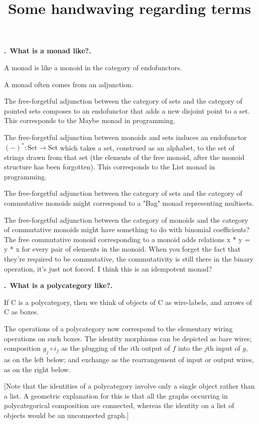 \documentclass[11pt,noamsfonts]{amsart}
\title{Some handwaving regarding terms}
\newcommand{\pointheader}{\vspace{2mm}\noindent\refstepcounter{section}\textbf{\thesection.}}
\newcommand{\bpoint}[1]{\pointheader~{\bf #1.}}
\begin{document}
\maketitle

\bpoint{What is a monad like?}

A monad is like a monoid in the category of endofunctors.

A monad often comes from an adjunction.

The free-forgetful adjunction between the category of sets and the category of pointed sets composes to an endofunctor that adds a new disjoint point to a set. This corresponds to the Maybe monad in programming.

The free-forgetful adjunction between monoids and sets induces an endofunctor \((-)^*: \mathrm{Set} \to \mathrm{Set}\) which takes a set, construed as an alphabet, to the set of strings drawn from that set (the elements of the free monoid, after the monoid structure has been forgotten). This corresponds to the List monad in programming.

The free-forgetful adjunction between the category of sets and the category of commutative monoids might correspond to a "Bag" monad representing multisets.

The free-forgetful adjunction between the category of monoids and the category of commutative monoids might have something to do with binomial coefficients?
The free commutative monoid corresponding to a monoid adds relations x * y = y * x for every pair of elements in the monoid. 
When you forget the fact that they're required to be commutative, the commutativity is still there in the binary operation, it's just not forced. I think this is an idempotent monad?

\bpoint{What is a polycategory like?}

If C is a polycategory, then we think of objects of C as wire-labels, and arrows of C as boxes.

The operations of a polycategory now correspond to the elementary wiring operations on such boxes.
The identity morphisms can be depicted as bare wires; composition \(g_j \circ i_f\) as the plugging of
the \(i\)th output of \(f\) into the \(j\)th input of \(g\), as on the left below; and exchange
as the rearrangement of input or output wires, as on the right below.

[Note that the identities of a polycategory involve only a single object rather
than a list. A geometric explanation for this is that all the graphs occurring
in polycategorical composition are connected, whereas the identity on a list of
objects would be an unconnected graph.]
\end{document}
